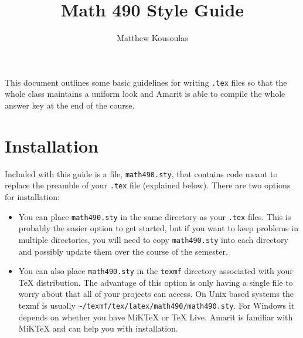 \documentclass{article}
\title{Math 490 Style Guide}
\author{Matthew Kousoulas}
\begin{document}
\maketitle


This document outlines some basic guidelines for writing \texttt{.tex} files so
that the whole class maintains a uniform look and Amarit is able to compile the
whole answer key at the end of the course.

\section*{Installation}
Included with this guide is a file, \texttt{math490.sty}, that contains code
meant to replace the preamble of your \texttt{.tex} file (explained below).
There are two options for installation:
\begin{itemize}
	\item You can place \texttt{math490.sty} in the same directory as your
		\texttt{.tex} files. This is probably the easier option to get started,
		but if you want to keep problems in multiple directories, you will need
		to copy \texttt{math490.sty} into each directory and possibly update
		them over the course of the semester.

	\item You can also place \texttt{math490.sty} in the \texttt{texmf}
		directory associated with your \TeX{} distribution. The advantage of
		this option is only having a single file to worry about that all of your
		projects can access. On Unix based systems the texmf is usually
		\texttt{\textasciitilde/texmf/tex/latex/math490/math490.sty}. For
		Windows it depends on whether you have MiKTeX or TeX Live. Amarit is
		familiar with MiKTeX and can help you with installation.
\end{itemize}
\end{document}
